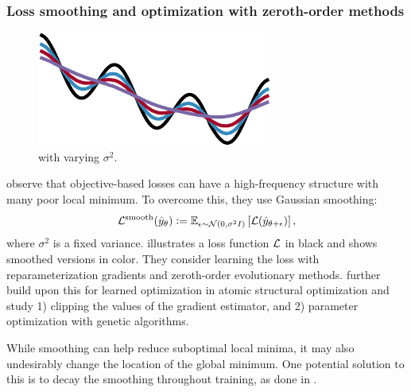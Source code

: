 \documentclass[twoside,11pt]{article}
\begin{document}
\subsubsection{Loss smoothing and optimization with zeroth-order methods}
\label{sec:smooth}

\begin{figure}
\vspace{-2mm}
\includegraphics[width=\linewidth]{fig/smoothed-loss.pdf}
\caption{ with varying $\sigma^2$.}
\label{fig:smooth-loss}
\end{figure}

\mbox{}\citet{metz2019understanding} observe that
objective-based losses can have a high-frequency
structure with many poor local minimum.
To overcome this, they use Gaussian smoothing:
\begin{equation}
  {\mathcal{L}}^{\rm smooth}(\hat y_\theta)\vcentcolon= \operatorname{\mathbb{E}}_{\epsilon\sim{\mathcal{N}}(0,\sigma^2 I)}\left[{\mathcal{L}}(\hat y_{\theta+\epsilon})\right],
  \label{eq:smooth-loss}
\end{equation}
where $\sigma^2$ is a fixed variance.
 illustrates a loss function ${\mathcal{L}}$ in
black and shows smoothed versions in color.
They consider learning the loss with reparameterization
gradients and zeroth-order evolutionary methods.
\citet{merchant2021learn2hop} further
build upon this for learned optimization in
atomic structural optimization
and study 1) clipping the values of the gradient estimator,
and 2) parameter optimization with genetic algorithms.

\begin{remark}
  While smoothing can help reduce suboptimal local
  minima, it may also undesirably change the
  location of the global minimum.
  One potential solution to this is to decay
  the smoothing throughout training, as done
  in \citet[Appendix~A.1]{amos2021model}.
\end{remark}
\end{document}
